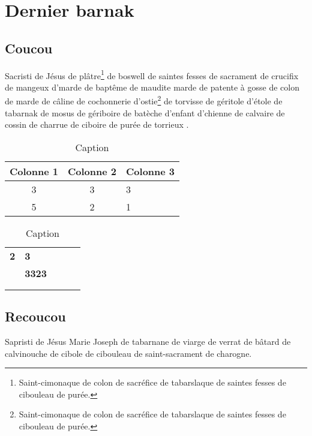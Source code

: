 \section{Dernier barnak}
\subsection{Coucou}
Sacristi de Jésus de plâtre\footnote{Saint-cimonaque de colon de sacréfice de tabarslaque de saintes fesses de cibouleau de purée.} de boswell de saintes fesses de sacrament de crucifix de mangeux d'marde de baptême de maudite marde de patente à gosse \addref de colon de marde de câline de cochonnerie d'ostie\footnote{Saint-cimonaque de colon de sacréfice de tabarslaque de saintes fesses de cibouleau de purée.} de torvisse de g\'eritole d'étole de tabarnak de mosus de gériboire de batèche d'enfant d'chienne de calvaire de cossin de charrue de ciboire de purée de torrieux \citep{jackson2012improvements}.

\begin{table}[!h]
    \centering
    \begin{tabular}{c|cl}
       Colonne 1  & Colonne 2 & Colonne 3 \\
       \hline 
        3 & 3 & 3 \\
        5 & 2 & 1
    \end{tabular}
    \caption{Caption}
    \label{tab:my_label}
\end{table}

\begin{table}[!h]
    \centering
    \begin{tabular}{lllll}
    \textbf{2}            & \textbf{3}            & \textbf{}                      &                       &  \\ \cline{4-4}
    \textbf{}             & \textbf{3323}         & \multicolumn{1}{l|}{\textbf{}} & \multicolumn{1}{l|}{} &  \\ \cline{2-2} \cline{4-4}
    \multicolumn{1}{l|}{} & \multicolumn{1}{l|}{} &                                &                       &  \\ \cline{2-2}
                          &                       &                                &                       & 
    \end{tabular}
    \caption{Caption}
    \label{tab:my_label2}
\end{table}

\subsection{Recoucou}
Sapristi de Jésus Marie Joseph de tabarnane de viarge de verrat de bâtard de calvinouche de cibole de cibouleau de saint-sacrament de charogne.
